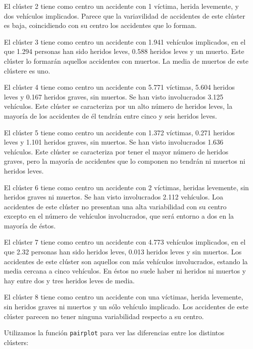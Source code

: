 \documentclass[a4]{article}
\begin{document}
El clúster 2 tiene como centro un accidente con 1 víctima, herida levemente, y dos vehículos implicados. Parece que la variavilidad de accidentes de este clúster es baja, coincidiendo con su centro los accidentes que lo forman.

El clúster 3 tiene como centro un accidente con 1.941 vehículos implicados, en el que 1.294 personas han sido heridos leves, 0.588 heridos leves y un muerto. Este clúster lo formarán aquellos accidentes con muertos. La media de muertos de este clústere es uno.

El clúster 4 tiene como centro un accidente con 5.771 víctimas, 5.604 heridos leves y 0.167 heridos graves, sin muertos. Se han visto involucrados 3.125 vehículos. Este clúster se caracteriza por un alto número de heridos leves, la mayoría de los accidentes de él tendrán entre cinco y seis heridos leves.

El clúster 5 tiene como centro un accidente con 1.372 víctimas, 0.271 heridos leves y 1.101 heridos graves, sin muertos. Se han visto involucrados 1.636 vehículos. Este clúster se caracteriza por tener el mayor número de heridos graves, pero la mayoría de accidentes que lo componen no tendrán ni muertos ni heridos leves.

El clúster 6 tiene como centro un accidente con 2 víctimas, heridas levemente, sin heridos graves ni muertos. Se han visto involucrados 2.112 vehículos. Loa accidentes de este clúster no presentan una alta variabilidad con su centro excepto en el número de vehículos involucrados, que será entorno a dos en la mayoría de éstos.

El clúster 7 tiene como centro un accidente con 4.773 vehículos implicados, en el que 2.32 personas han sido heridos leves, 0.013 heridos leves y sin muertos. Los accidentes de este clúster son aquellos con más vehículos involucrados, estando la media cercana a cinco vehículos. En éstos no suele haber ni heridos ni muertos y hay entre dos y tres heridos leves de media.

El clúster 8 tiene como centro un accidente con una víctimas, herida levemente, sin heridos graves ni muertos y un sólo vehículo implicado. Los accidentes de este clúster parecen no tener ninguna variabilidad respecto a su centro.

Utilizamos la función \texttt{pairplot} para ver las diferencias entre los distintos clústers:
\end{document}

